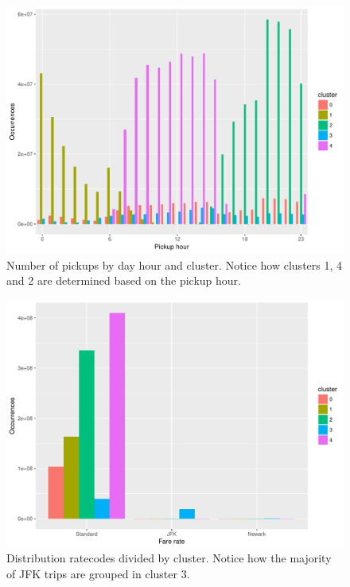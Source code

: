 \documentclass{acm_proc_article-sp-sigmod09}
\begin{document}
\begin{figure}
	\centering
	\includegraphics[width=1\columnwidth]{resources/clustered_plots/pickup_hour_dist.pdf}
	\caption{Number of pickups by day hour and cluster. Notice how clusters 1, 4 and 2 are determined based on the pickup hour.}
	\label{fig:clusterPickupHour}
\end{figure}
\begin{figure}
	\centering
	\includegraphics[width=1\columnwidth]{resources/clustered_plots/ratecode_distr.pdf}
	\caption{Distribution ratecodes divided by cluster. Notice how the majority of JFK trips are grouped in cluster 3.}
	\label{fig:clusterRatecode}
\end{figure}
\end{document}
